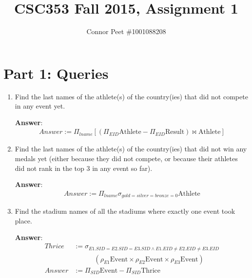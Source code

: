 \documentclass{article}
\title{CSC353 Fall 2015, Assignment 1}
\author{Connor Peet \#1001088208}
\begin{document}
\maketitle

\section*{Part 1: Queries}

\begin{enumerate}

\item   %
Find the last names of the athlete(s) of the country(ies) that did not compete in any event yet.

{\bf Answer}:\\[5pt]
\begin{equation}
\begin{aligned}
Answer := \Pi_{lname} [(\Pi_{EID} \mathrm{Athlete} - \Pi_{EID} \mathrm{Result}) \bowtie \mathrm{Athlete}]
\end{aligned}
\end{equation}

\item   %
Find the last names of the athlete(s) of the country(ies) that did not win any medals yet (either because they did not compete, or because their athletes did not rank in the top 3 in any event so far).

{\bf Answer}:\\[5pt]
\begin{equation}
\begin{aligned}
Answer := \Pi_{lname} \sigma_{gold=silver=bronze=0} \mathrm{Athlete}
\end{aligned}
\end{equation}


\item   %
Find the stadium names of all the stadiums where exactly one event took place.

{\bf Answer}:\\[5pt]
\begin{equation}
\begin{aligned}
Thrice & := \sigma_{E1.SID=E2.SID=E3.SID \land E1.EID \neq E2.EID \neq E3.EID}\\
    & \quad \quad \quad (\rho_{E1} \mathrm{Event} \times \rho_{E2} \mathrm{Event} \times \rho_{E3} \mathrm{Event})\\
Answer & := \Pi_{SID} \mathrm{Event} - \Pi_{SID} \mathrm{Thrice}
\end{aligned}
\end{equation}



\end{enumerate}
\end{document}
